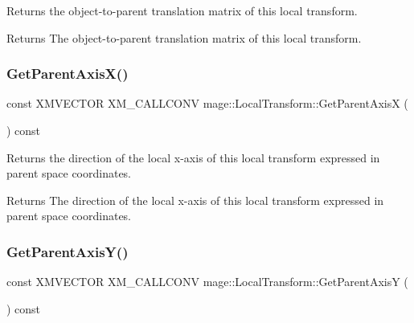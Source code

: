 Returns the object-\/to-\/parent translation matrix of this local transform.

\begin{DoxyReturn}{Returns}
The object-\/to-\/parent translation matrix of this local transform. 
\end{DoxyReturn}
\mbox{\label{classmage_1_1_local_transform_a211651b89d7720bf98468ea7665b74d9}} 
\subsubsection{\texorpdfstring{Get\+Parent\+Axis\+X()}{GetParentAxisX()}}
{\footnotesize\ttfamily const X\+M\+V\+E\+C\+T\+OR X\+M\+\_\+\+C\+A\+L\+L\+C\+O\+NV mage\+::\+Local\+Transform\+::\+Get\+Parent\+AxisX (\begin{DoxyParamCaption}{ }\end{DoxyParamCaption}) const\hspace{0.3cm}{\ttfamily [noexcept]}}

Returns the direction of the local x-\/axis of this local transform expressed in parent space coordinates.

\begin{DoxyReturn}{Returns}
The direction of the local x-\/axis of this local transform expressed in parent space coordinates. 
\end{DoxyReturn}
\mbox{\label{classmage_1_1_local_transform_af53f1ef489bc5dec9d5b8ccea6e5e9bf}} 
\subsubsection{\texorpdfstring{Get\+Parent\+Axis\+Y()}{GetParentAxisY()}}
{\footnotesize\ttfamily const X\+M\+V\+E\+C\+T\+OR X\+M\+\_\+\+C\+A\+L\+L\+C\+O\+NV mage\+::\+Local\+Transform\+::\+Get\+Parent\+AxisY (\begin{DoxyParamCaption}{ }\end{DoxyParamCaption}) const\hspace{0.3cm}{\ttfamily [noexcept]}}

